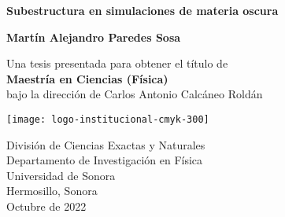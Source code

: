 
\setlength{\headheight}{15.25pt}

\setcounter{page}{1}


\newcommand{\thesistitle}{Subestructura en simulaciones de materia oscura}
\newcommand{\minombre}{Martín Alejandro Paredes Sosa}
\newcommand{\supername}{Carlos Antonio Calcáneo Roldán}
\newcommand{\mespresentado}{Octubre de 2022}
\newpage

\thispagestyle{empty}
\begin{center}
  \vspace*{0.5cm}
  {\Huge \bf \thesistitle}

  \vspace*{2cm}
  {\LARGE\bf \minombre}

  \vfill

  {\Large Una tesis presentada para obtener el título de\\
    \vspace{.3cm}
    {\bf Maestría en Ciencias (Física)}\\
    \vspace{.6cm}
    bajo la dirección de \supername}
  \vspace*{0.9cm}

   \begin{center}
   \texttt{[image: logo-institucional-cmyk-300]}
   \end{center}

  {\large División de Ciencias Exactas y Naturales\\
          [-3mm] Departamento de Investigación en Física\\
          [-3mm] Universidad de Sonora\\
          [-3mm] Hermosillo, Sonora\\
          [1mm]  \mespresentado}

\end{center}

